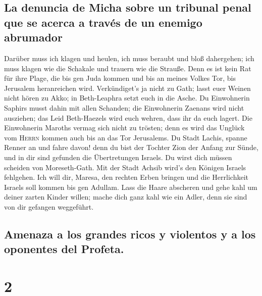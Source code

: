 \hypertarget{la-denuncia-de-micha-sobre-un-tribunal-penal-que-se-acerca-a-travuxe9s-de-un-enemigo-abrumador}{%
\subsection{La denuncia de Micha sobre un tribunal penal que se acerca a
través de un enemigo
abrumador}\label{la-denuncia-de-micha-sobre-un-tribunal-penal-que-se-acerca-a-travuxe9s-de-un-enemigo-abrumador}}

 Darüber muss ich klagen und heulen, ich muss beraubt und
bloß dahergehen; ich muss klagen wie die Schakale und trauern wie die
Strauße.  Denn es ist kein Rat für ihre Plage, die bis gen
Juda kommen und bis an meines Volkes Tor, bis Jerusalem heranreichen
wird.  Verkündiget's ja nicht zu Gath; lasst euer Weinen
nicht hören zu Akko; in Beth-Leaphra setzt euch in die Asche.
 Du Einwohnerin Saphirs musst dahin mit allen Schanden;
die Einwohnerin Zaenans wird nicht ausziehen; das Leid Beth-Haezels wird
euch wehren, dass ihr da euch lagert.  Die Einwohnerin
Maroths vermag sich nicht zu trösten; denn es wird das Unglück vom
\textsc{Herrn} kommen auch bis an das Tor Jerusalems.  Du
Stadt Lachis, spanne Renner an und fahre davon! denn du bist der Tochter
Zion der Anfang zur Sünde, und in dir sind gefunden die Übertretungen
Israels.  Du wirst dich müssen scheiden von
Moreseth-Gath. Mit der Stadt Achsib wird's den Königen Israels
fehlgehen.  Ich will dir, Maresa, den rechten Erben
bringen und die Herrlichkeit Israels soll kommen bis gen Adullam.
 Lass die Haare abscheren und gehe kahl um deiner zarten
Kinder willen; mache dich ganz kahl wie ein Adler, denn sie sind von dir
gefangen weggeführt.

\hypertarget{amenaza-a-los-grandes-ricos-y-violentos-y-a-los-oponentes-del-profeta.}{%
\subsection{Amenaza a los grandes ricos y violentos y a los oponentes
del
Profeta.}\label{amenaza-a-los-grandes-ricos-y-violentos-y-a-los-oponentes-del-profeta.}}

\hypertarget{section-1}{%
\section{2}\label{section-1}}

